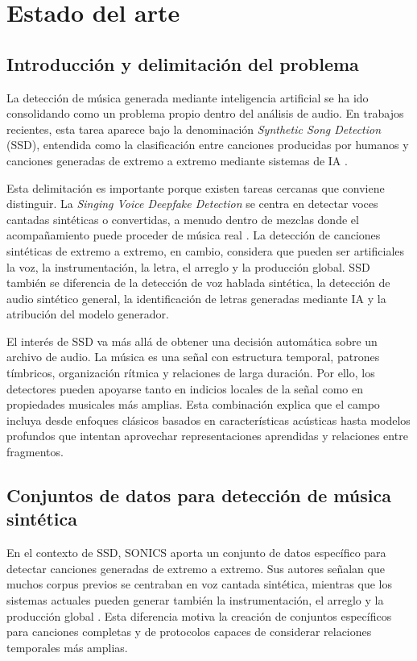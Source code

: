 \chapter{Estado del arte}
\label{cap:estado-arte}

\section{Introducción y delimitación del problema}

La detección de música generada mediante inteligencia artificial se ha ido consolidando como un problema propio dentro del análisis de audio. En trabajos recientes, esta tarea aparece bajo la denominación \textit{Synthetic Song Detection} (SSD), entendida como la clasificación entre canciones producidas por humanos y canciones generadas de extremo a extremo mediante sistemas de IA \cite{rahman2024sonics}.

Esta delimitación es importante porque existen tareas cercanas que conviene distinguir. La \textit{Singing Voice Deepfake Detection} se centra en detectar voces cantadas sintéticas o convertidas, a menudo dentro de mezclas donde el acompañamiento puede proceder de música real \cite{zang2023singfake,zang2024ctrsvdd}. La detección de canciones sintéticas de extremo a extremo, en cambio, considera que pueden ser artificiales la voz, la instrumentación, la letra, el arreglo y la producción global. SSD también se diferencia de la detección de voz hablada sintética, la detección de audio sintético general, la identificación de letras generadas mediante IA y la atribución del modelo generador.

El interés de SSD va más allá de obtener una decisión automática sobre un archivo de audio. La música es una señal con estructura temporal, patrones tímbricos, organización rítmica y relaciones de larga duración. Por ello, los detectores pueden apoyarse tanto en indicios locales de la señal como en propiedades musicales más amplias. Esta combinación explica que el campo incluya desde enfoques clásicos basados en características acústicas hasta modelos profundos que intentan aprovechar representaciones aprendidas y relaciones entre fragmentos.

\section{Conjuntos de datos para detección de música sintética}

En el contexto de SSD, SONICS aporta un conjunto de datos específico para detectar canciones generadas de extremo a extremo. Sus autores señalan que muchos corpus previos se centraban en voz cantada sintética, mientras que los sistemas actuales pueden generar también la instrumentación, el arreglo y la producción global \cite{rahman2024sonics}. Esta diferencia motiva la creación de conjuntos específicos para canciones completas y de protocolos capaces de considerar relaciones temporales más amplias.

